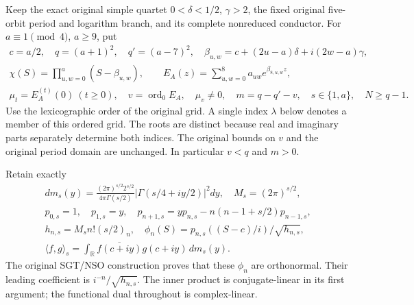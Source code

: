 \documentclass[11pt,a4paper]{article}
\begin{document}
Keep the exact original simple quartet $0<\delta<1/2$, $\gamma>2$,
the fixed original five-orbit period and logarithm branch, and its
complete nonreduced conductor. For $a\equiv1\pmod4$, $a\ge9$, put
\[
\begin{gathered}
 c=a/2,\quad q=(a+1)^2,\quad q'=(a-7)^2,
 \quad\beta_{u,w}=c+(2u-a)\delta+i(2w-a)\gamma,\\
 \chi(S)=\prod_{u,w=0}^a(S-\beta_{u,w}),\qquad
 E_A(z)=\sum_{u,w=0}^8a_{uw}e^{\beta_{8,u,w}z},\\
 \mu_t=E_A^{(t)}(0)\ (t\ge0),\quad
 v=\operatorname{ord}_0E_A,\quad \mu_v\ne0,
 \quad m=q-q'-v,\quad s\in\{1,a\},\quad N\ge q-1.
\end{gathered}                                                    \tag{IGI1}
\]
Use the lexicographic order of the original grid. A single index
$\lambda$ below denotes a member of this ordered grid. The roots are
distinct because real and imaginary parts separately determine both
indices. The original bounds on $v$ and the original period domain
are unchanged. In particular $v<q$ and $m>0$.

Retain exactly
\[
\begin{gathered}
 dm_s(y)=\frac{(2\pi)^{s/2}2^{s/2}}{4\pi\Gamma(s/2)}
             |\Gamma(s/4+iy/2)|^2dy,\quad M_s=(2\pi)^{s/2},\\
 p_{0,s}=1,\quad p_{1,s}=y,\quad
 p_{n+1,s}=yp_{n,s}-n(n-1+s/2)p_{n-1,s},\\
 h_{n,s}=M_sn!(s/2)_n,\quad
 \phi_n(S)=p_{n,s}((S-c)/i)/\sqrt{h_{n,s}},\\
 \langle f,g\rangle_s=\int_{\mathbb R}
                 \overline{f(c+iy)}g(c+iy)\,dm_s(y).
\end{gathered}                                                    \tag{IGI2}
\]
The original SGT/NSO construction proves that these $\phi_n$ are
orthonormal. Their leading coefficient is $i^{-n}/\sqrt{h_{n,s}}$.
The inner product is conjugate-linear in its first argument; the
functional dual throughout is complex-linear.
\end{document}
